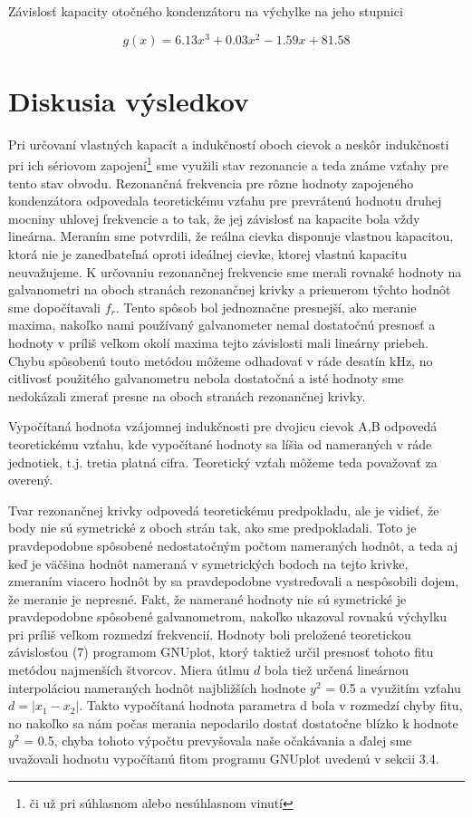 \documentclass{article}
\begin{document}
\begin{graph}[ht]
		\centering
		
		\caption{Závislosť kapacity otočného kondenzátoru na výchylke na jeho stupnici}
\end{graph}

$$g(x) = 6.13x^3 + 0.03x^2 - 1.59x + 81.58$$

\newpage
\section{Diskusia výsledkov}
Pri určovaní vlastných kapacít a indukčností oboch cievok a neskôr indukčnosti pri ich sériovom zapojení\footnote{či už pri súhlasnom alebo nesúhlasnom vinutí} sme využili stav rezonancie a teda známe vzťahy pre tento stav obvodu. Rezonančná frekvencia pre rôzne hodnoty zapojeného kondenzátora odpovedala teoretickému vzťahu pre prevrátenú hodnotu druhej mocniny uhlovej frekvencie a to tak, že jej závislosť na kapacite bola vždy lineárna. Meraním sme potvrdili, že reálna cievka disponuje vlastnou kapacitou, ktorá nie je zanedbateľná oproti ideálnej cievke, ktorej vlastnú kapacitu neuvažujeme. K určovaniu rezonančnej frekvencie sme merali rovnaké hodnoty na galvanometri na oboch stranách rezonančnej krivky a priemerom týchto hodnôt sme dopočítavali $f_r$. Tento spôsob bol jednoznačne presnejší, ako meranie maxima, nakoľko nami používaný galvanometer nemal dostatočnú presnosť a hodnoty v príliš veľkom okolí maxima tejto závislosti mali lineárny priebeh. Chybu spôsobenú touto metódou môžeme odhadovať v ráde desatín kHz, no citlivosť použitého galvanometru nebola dostatočná a isté hodnoty sme nedokázali zmerať presne na oboch stranách rezonančnej krivky. 

Vypočítaná hodnota vzájomnej indukčnosti pre dvojicu cievok A,B odpovedá teoretickému vzťahu, kde vypočítané hodnoty sa líšia od nameraných v ráde jednotiek, t.j. tretia platná cifra. Teoretický vzťah môžeme teda považovať za overený. 

Tvar rezonančnej krivky odpovedá teoretickému predpokladu, ale je vidieť, že body nie sú symetrické z oboch strán tak, ako sme predpokladali. Toto je pravdepodobne spôsobené nedostatočným počtom nameraných hodnôt, a teda aj keď je väčšina hodnôt nameraná v symetrických bodoch na tejto krivke, zmeraním viacero hodnôt by sa pravdepodobne vystreďovali a nespôsobili dojem, že meranie je nepresné. Fakt, že namerané hodnoty nie sú symetrické je pravdepodobne spôsobené galvanometrom, nakoľko ukazoval rovnakú výchylku pri príliš veľkom rozmedzí frekvencií. Hodnoty boli preložené teoretickou závislosťou (7) programom GNUplot, ktorý taktiež určil presnosť tohoto fitu metódou najmenších štvorcov. Miera útlmu $d$ bola tiež určená lineárnou interpoláciou nameraných hodnôt najbližších hodnote $y^2$ = 0.5 a využitím vzťahu $d = |x_1 - x_2|$. Takto vypočítaná hodnota parametra d bola v rozmedzí chyby fitu, no nakoľko sa nám počas merania nepodarilo dostať dostatočne blízko k hodnote $y^2$ = 0.5, chyba tohoto výpočtu prevyšovala naše očakávania a ďalej sme uvažovali hodnotu vypočítanú fitom programu GNUplot uvedenú v sekcii 3.4.
\end{document}
